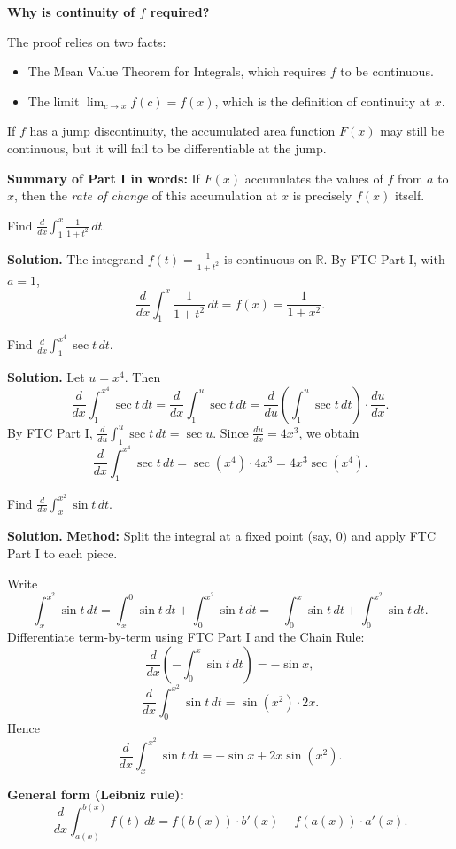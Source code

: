 \textbf{Why is continuity of $f$ required?}

The proof relies on two facts:
\begin{itemize}[leftmargin=*]
\item The Mean Value Theorem for Integrals, which requires $f$ to be continuous.
\item The limit $\lim_{c\to x}f(c)=f(x)$, which is the definition of continuity at $x$.
\end{itemize}
If $f$ has a jump discontinuity, the accumulated area function $F(x)$ may still be continuous, but it will fail to be differentiable at the jump.

\vspace{0.5em}

\textbf{Summary of Part I in words:} If $F(x)$ accumulates the values of $f$ from $a$ to $x$, then the \emph{rate of change} of this accumulation at $x$ is precisely $f(x)$ itself.

\begin{examplebox}[title={Worked Example: FTC Part I (direct application)}]
Find $\displaystyle \frac{d}{dx}\int_1^x \frac{1}{1+t^2}\,dt$.

\textbf{Solution.}
The integrand $f(t)=\frac{1}{1+t^2}$ is continuous on $\mathbb{R}$. By FTC Part I, with $a=1$,
\[
\frac{d}{dx}\int_1^x \frac{1}{1+t^2}\,dt = f(x)=\frac{1}{1+x^2}.
\]
\end{examplebox}

\begin{examplebox}[title={Worked Example: FTC Part I with Chain Rule}]
Find $\displaystyle \frac{d}{dx}\int_1^{x^4} \sec t\,dt$.

\textbf{Solution.}
Let $u=x^4$. Then
\[
\frac{d}{dx}\int_1^{x^4} \sec t\,dt = \frac{d}{dx}\int_1^u \sec t\,dt = \frac{d}{du}\left(\int_1^u \sec t\,dt\right)\cdot \frac{du}{dx}.
\]
By FTC Part I, $\displaystyle \frac{d}{du}\int_1^u \sec t\,dt = \sec u$. Since $\frac{du}{dx}=4x^3$, we obtain
\[
\frac{d}{dx}\int_1^{x^4} \sec t\,dt = \sec(x^4)\cdot 4x^3 = 4x^3\sec(x^4).
\]
\end{examplebox}

\begin{examplebox}[title={Worked Example: FTC Part I with two variable limits (Leibniz rule)}]
Find $\displaystyle \frac{d}{dx}\int_{x}^{x^2} \sin t\,dt$.

\textbf{Solution.}
\textbf{Method:} Split the integral at a fixed point (say, $0$) and apply FTC Part I to each piece.

Write
\[
\int_x^{x^2} \sin t\,dt = \int_x^0 \sin t\,dt + \int_0^{x^2} \sin t\,dt = -\int_0^x \sin t\,dt + \int_0^{x^2} \sin t\,dt.
\]
Differentiate term-by-term using FTC Part I and the Chain Rule:
\[
\frac{d}{dx}\left(-\int_0^x \sin t\,dt\right)=-\sin x,
\]
\[
\frac{d}{dx}\int_0^{x^2} \sin t\,dt = \sin(x^2)\cdot 2x.
\]
Hence
\[
\frac{d}{dx}\int_x^{x^2} \sin t\,dt = -\sin x + 2x\sin(x^2).
\]

\textbf{General form (Leibniz rule):}
\[
\frac{d}{dx}\int_{a(x)}^{b(x)} f(t)\,dt = f(b(x))\cdot b'(x) - f(a(x))\cdot a'(x).
\]
\end{examplebox}

